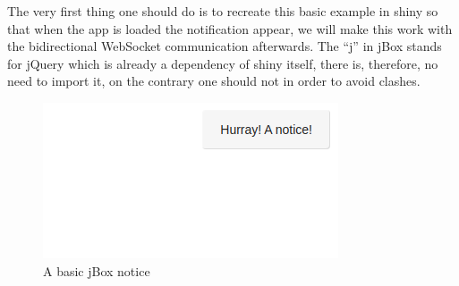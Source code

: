 \documentclass[
]{krantz}
\makeatletter
\newenvironment{Shaded}{\begin{snugshade}}{\end{snugshade}}
\newcommand{\ControlFlowTok}[1]{\textcolor[rgb]{0.27,0.27,0.27}{\textbf{#1}}}
\newcommand{\DataTypeTok}[1]{\textcolor[rgb]{0.27,0.27,0.27}{#1}}
\newcommand{\KeywordTok}[1]{\textcolor[rgb]{0.27,0.27,0.27}{\textbf{#1}}}
\newcommand{\NormalTok}[1]{#1}
\newcommand{\OperatorTok}[1]{\textcolor[rgb]{0.43,0.43,0.43}{\textbf{#1}}}
\newcommand{\StringTok}[1]{\textcolor[rgb]{0.5,0.5,0.5}{#1}}
\newenvironment{kframe}{%
\medskip{}
\setlength{\fboxsep}{.8em}
 \def\at@end@of@kframe{}%
 \ifinner\ifhmode%
  \def\at@end@of@kframe{\end{minipage}}%
  \begin{minipage}{\columnwidth}%
 \fi\fi%
 \def\FrameCommand##1{\hskip\@totalleftmargin \hskip-\fboxsep
 \colorbox{shadecolor}{##1}\hskip-\fboxsep
     \hskip-\linewidth \hskip-\@totalleftmargin \hskip\columnwidth}%
 \MakeFramed {\advance\hsize-\width
   \@totalleftmargin\z@ \linewidth\hsize
   \@setminipage}}%
 {\par\unskip\endMakeFramed%
 \at@end@of@kframe}
\renewenvironment{Shaded}{\begin{kframe}}{\end{kframe}}
\makeatother
\begin{document}
The very first thing one should do is to recreate this basic example in shiny so that when the app is loaded the notification appear, we will make this work with the bidirectional WebSocket communication afterwards. The ``j'' in jBox stands for jQuery which is already a dependency of shiny itself, there is, therefore, no need to import it, on the contrary one should not in order to avoid clashes.

\begin{Shaded}
\end{Shaded}

\begin{figure}[t]

{\centering \includegraphics[width=1\linewidth]{images/jbox-init} 

}

\caption{A basic jBox notice}\label{fig:jbox-init}
\end{figure}
\end{document}
